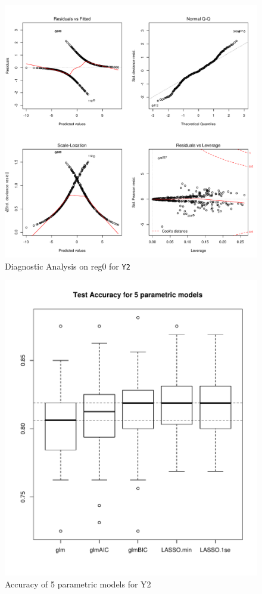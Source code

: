\documentclass[11pt,oneside,a4paper]{article}
\newcommand{\m}[1]{\texttt{{#1}}}
\begin{document}
\begin{figure}[!ht]
    \centering
	\includegraphics[scale=0.8]{./pic/class_reg0.pdf}
    \caption{Diagnostic Analysis on reg0 for \m{Y2}}
 	\label{DiagregY20}
\end{figure}

\begin{figure}[!ht]
    \centering
	\includegraphics[scale=0.8]{./pic/class_Acc5.pdf}
    \caption{Accuracy of 5 parametric models for Y2}
 	\label{class_acc5}
\end{figure}
\end{document}
